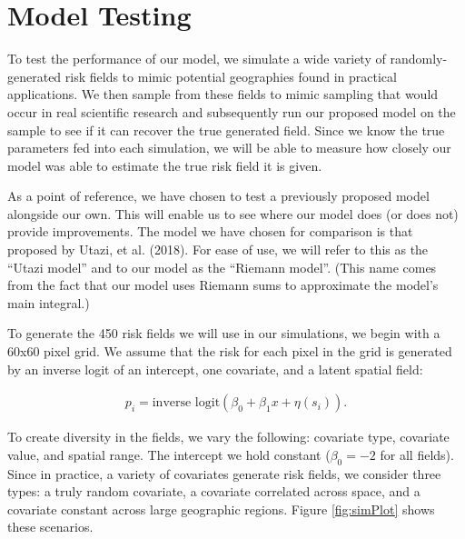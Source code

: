 \documentclass{article}
\begin{document}
\section{Model Testing}\label{model testing}

To test the performance of our model, we simulate a wide variety of randomly-generated risk fields to mimic potential geographies found in practical applications. We then sample from these fields to mimic sampling that would occur in real scientific research and subsequently run our proposed model on the sample to see if it can recover the true generated field. Since we know the true parameters fed into each simulation, we will be able to measure how closely our model was able to estimate the true risk field it is given.

As a point of reference, we have chosen to test a previously proposed model alongside our own. This will enable us to see where our model does (or does not) provide improvements. The model we have chosen for comparison is that proposed by Utazi, et al. (2018). For ease of use, we will refer to this as the ``Utazi model'' and to our model as the ``Riemann model''. (This name comes from the fact that our model uses Riemann sums to approximate the model's main integral.)

To generate the 450 risk fields we will use in our simulations, we begin with a 60x60 pixel grid. We assume that the risk for each pixel in the grid is generated by an inverse logit of an intercept, one covariate, and a latent spatial field:

\begin{align}\label{lin}
p_i=\text{inverse logit}(\beta_0+\beta_1x+ \eta(s_i)).
\end{align}

To create diversity in the fields, we vary the following: covariate type, covariate value, and spatial range. The intercept we hold constant ($\beta_0=-2$ for all fields). Since in practice, a variety of covariates generate risk fields, we consider three types: a truly random covariate, a covariate correlated across space, and a covariate constant across large geographic regions. Figure \ref{fig:simPlot} shows these scenarios.
\end{document}
